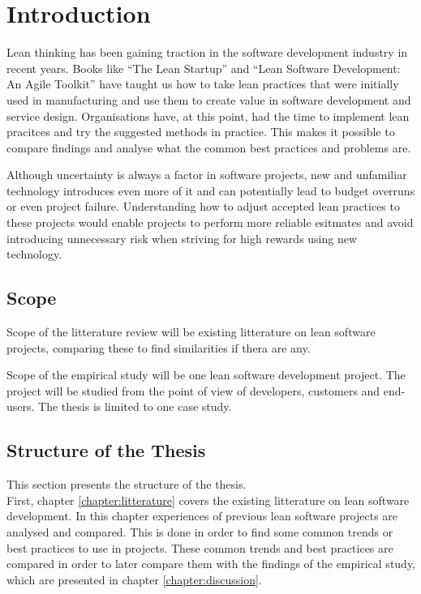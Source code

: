 

\chapter{Introduction}
\label{chapter:intro}

Lean thinking has been gaining traction in the software development industry in recent years. Books like ``The Lean Startup'' and ``Lean Software Development: An Agile Toolkit'' have taught us how to take lean practices that were initially used in manufacturing and use them to create value in software development and service design. Organisations have, at this point, had the time to implement lean pracitces and try the suggested methods in practice. This makes it possible to compare findings and analyse what the common best practices and problems are.

Although uncertainty is always a factor in software projects, new and unfamiliar technology introduces even more of it and can potentially lead to budget overruns or even project failure. Understanding how to adjust accepted lean practices to these projects would enable projects to perform more reliable esitmates and avoid introducing unnecessary risk when striving for high rewards using new technology.

\section{Scope}
\label{section:scope}

Scope of the litterature review will be existing litterature on lean software projects, comparing these to find similarities if thera are any.

Scope of the empirical study will be one lean software development project. The project will be studied from the point of view of developers, customers and end-users. The thesis is limited to one case study.

\section{Structure of the Thesis}
\label{section:structure}

This section presents the structure of the thesis.\\

First, chapter \ref{chapter:litterature} covers the existing litterature on lean software development. In this chapter experiences of previous lean software projects are analysed and compared. This is done in order to find some common trends or best practices to use in projects. These common trends and best practices are compared in order to later compare them with the findings of the empirical study, which are presented in chapter \ref{chapter:discussion}.

